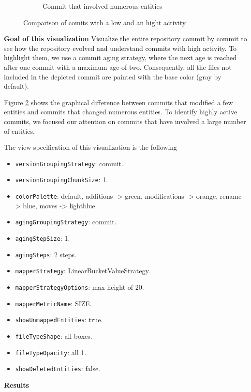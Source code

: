 \begin{figure}[t!]
\begin{subfigure}{0.42\textwidth}
        \caption{Commit that involved numerous entities} \label{fig:JetUML_V0E1}
    \end{subfigure}
    \caption{Comparison of comits with a low and an hight activity} 
    \label{fig:JetUML_V0E0}
\end{figure}

\textbf{Goal of this visualization} Visualize the entire repository commit by commit to see how the repository evolved and understand commits with high activity. 
To highlight them, we use a commit aging strategy, where the next age is reached after one commit with a maximum age of two.
Consequently, all the files not included in the depicted commit are painted with the base color (gray by default). 

Figure \ref{fig:JetUML_V0E0} shows the graphical difference between commits that modified a few entities and commits that changed numerous entities. 
To identify highly active commits, we focused our attention on commits that have involved a large number of entities. 

The view specification of this visualization is the following
\begin{itemize}
    \item \texttt{versionGroupingStrategy}: commit.
    \item \texttt{versionGroupingChunkSize}: 1. 
    \item \texttt{colorPalette}: default, additions -> green, modifications -> orange, rename -> blue, moves -> lightblue.
    \item \texttt{agingGroupingStrategy}: commit.
    \item \texttt{agingStepSize}: 1.
    \item \texttt{agingSteps}: 2 steps. 
    \item \texttt{mapperStrategy}: LinearBucketValueStrategy.
    \item \texttt{mapperStrategyOptions}: max height of 20.
    \item \texttt{mapperMetricName}: SIZE. 
    \item \texttt{showUnmappedEntities}: true.
    \item \texttt{fileTypeShape}: all boxes. 
    \item \texttt{fileTypeOpacity}: all 1. 
    \item \texttt{showDeletedEntities}: false.
\end{itemize}



\textbf{Results}

